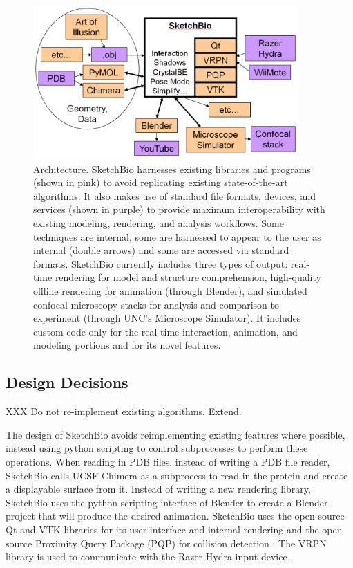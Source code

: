 \documentclass[twocolumn]{bmcart}%
\begin{document}
\begin{figure}[ht]
    \begin{center}
    \noindent\includegraphics[width=0.9\textwidth]
    {system_diagram.png}
    \end{center}
\caption{Architecture.  SketchBio harnesses existing libraries and programs (shown in pink) to avoid replicating existing state-of-the-art algorithms.  It also makes use of standard file formats, devices, and services (shown in purple) to provide maximum interoperability with existing modeling, rendering, and analysis workflows.  Some techniques are internal, some are harnessed to appear to the user as internal (double arrows) and some are accessed via standard formats.  SketchBio currently includes three types of output: real-time rendering for model and structure comprehension, high-quality offline rendering for animation (through Blender), and simulated confocal microscopy stacks for analysis and comparison to experiment (through UNC's Microscope Simulator).  It includes custom code only for the real-time interaction, animation, and modeling portions and for its novel features.}
\label{fig:architecture}
\end{figure}

\subsection*{Design Decisions}
XXX Do not re-implement existing algorithms.  Extend.

The design of SketchBio avoids reimplementing existing features where possible, instead using python scripting to control subprocesses to perform these operations.  When reading in PDB files, instead of writing a PDB file reader, SketchBio calls UCSF Chimera as a subprocess to read in the protein and create a displayable surface from it.  Instead of writing a new rendering library, SketchBio uses the python scripting interface of Blender to create a Blender project that will produce the desired animation.  SketchBio uses the open source Qt and VTK\cite{VTKbook} libraries for its user interface and internal rendering and the open source Proximity Query Package (PQP) for collision detection \cite{PQP}.  The VRPN library is used to communicate with the Razer Hydra input device \cite{taylor2001vrpn}.
\end{document}

